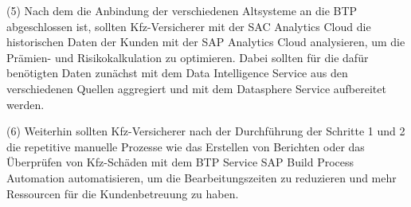 (5) Nach dem die Anbindung der verschiedenen Altsysteme an die BTP abgeschlossen ist, sollten Kfz-Versicherer mit der SAC Analytics Cloud die historischen Daten der Kunden mit der SAP Analytics Cloud analysieren, um die Prämien- und Risikokalkulation zu optimieren. Dabei sollten für die dafür benötigten Daten zunächst mit dem Data Intelligence Service aus den verschiedenen Quellen aggregiert und mit dem Datasphere Service aufbereitet werden.

(6) Weiterhin sollten Kfz-Versicherer nach der Durchführung der Schritte 1 und 2 die repetitive manuelle Prozesse wie das Erstellen von Berichten oder das Überprüfen von Kfz-Schäden mit dem BTP Service SAP Build Process Automation automatisieren, um die Bearbeitungszeiten zu reduzieren und mehr Ressourcen für die Kundenbetreuung zu haben.







